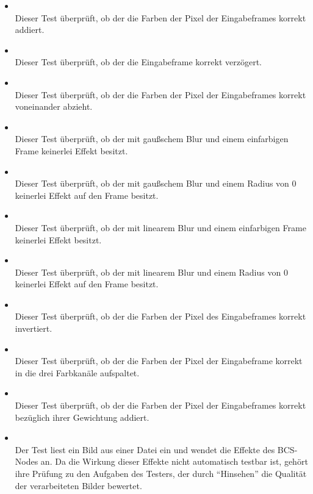 \begin{itemize}

\item{}~\\
Dieser Test überprüft, ob der  die Farben der Pixel der Eingabeframes korrekt addiert.

\item{}~\\
Dieser Test überprüft, ob der  die Eingabeframe korrekt verzögert.

\item{}~\\
Dieser Test überprüft, ob der  die Farben der Pixel der Eingabeframes korrekt voneinander abzieht.

\item{}~\\
Dieser Test überprüft, ob der  mit gaußschem Blur und einem einfarbigen Frame keinerlei Effekt besitzt.

\item{}~\\
Dieser Test überprüft, ob der  mit gaußschem Blur und einem Radius von 0 keinerlei Effekt auf den Frame besitzt.

\item{}~\\
Dieser Test überprüft, ob der  mit linearem Blur und einem einfarbigen Frame keinerlei Effekt besitzt.

\item{}~\\
Dieser Test überprüft, ob der  mit linearem Blur und einem Radius von 0 keinerlei Effekt auf den Frame besitzt.

\item{}~\\
Dieser Test überprüft, ob der  die Farben der Pixel des Eingabeframes korrekt invertiert.

\item{}~\\
Dieser Test überprüft, ob der  die Farben der Pixel der Eingabeframe korrekt in die drei Farbkanäle aufspaltet.

\item{}~\\
Dieser Test überprüft, ob der  die Farben der Pixel der Eingabeframes korrekt bezüglich ihrer Gewichtung addiert.

\item{}~\\
Der Test liest ein Bild aus einer Datei ein und wendet die Effekte des BCS-Nodes an. Da die Wirkung dieser Effekte nicht automatisch testbar ist, gehört ihre Prüfung zu den Aufgaben des Testers, der durch ``Hinsehen'' die Qualität der verarbeiteten Bilder bewertet.

\end{itemize}

